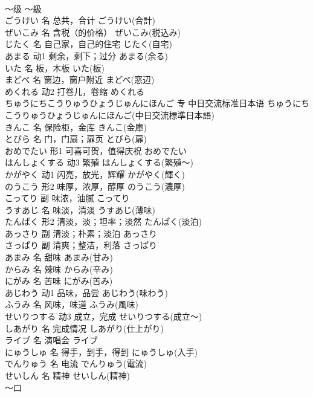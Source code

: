 \documentclass[8pt]{extreport}
\begin{document}
\begin{CJK}{UTF8}{min}
\\	～级	～級	
\\	ごうけい	名	总共，合计	ごうけい(合計)	
\\	ぜいこみ	名	含税（的价格）	ぜいこみ(税込み)	
\\	じたく	名	自己家，自己的住宅	じたく(自宅)	
\\	あまる	动1	剩余，剩下；过分	あまる(余る)	
\\	いた	名	板，木板	いた(板)	
\\	まどべ	名	窗边，窗户附近	まどべ(窓辺)	
\\	めくれる	动2	打卷儿，卷缩	めくれる	
\\	ちゅうにちこうりゅうひょうじゅんにほんご	专	中日交流标准日本语	ちゅうにちこうりゅうひょうじゅんにほんご(中日交流標準日本語)	
\\	きんこ	名	保险柜，金库	きんこ(金庫)	
\\	とびら	名	门，门扇；扉页	とびら(扉)	
\\	おめでたい	形1	可喜可贺，值得庆祝	おめでたい	
\\	はんしょくする	动3	繁殖	はんしょくする(繁殖～)	
\\	かがやく	动1	闪亮，放光，辉耀	かがやく(輝く)	
\\	のうこう	形2	味厚，浓厚，醇厚	のうこう(濃厚)	
\\	こってり	副	味浓，油腻	こってり	
\\	うすあじ	名	味淡，清淡	うすあじ(薄味)	
\\	たんぱく	形2	清淡，淡；坦率；淡然	たんぱく(淡泊)	
\\	あっさり	副	清淡；朴素；淡泊	あっさり	
\\	さっぱり	副	清爽；整洁，利落	さっぱり	
\\	あまみ	名	甜味	あまみ(甘み)	
\\	からみ	名	辣味	からみ(辛み)	
\\	にがみ	名	苦味	にがみ(苦み)	
\\	あじわう	动1	品味，品尝	あじわう(味わう)	
\\	ふうみ	名	风味，味道	ふうみ(風味)	
\\	せいりつする	动3	成立，完成	せいりつする(成立～)	
\\	しあがり	名	完成情况	しあがり(仕上がり)	
\\	ライブ	名	演唱会	ライブ	
\\	にゅうしゅ	名	得手，到手，得到	にゅうしゅ(入手)	
\\	でんりゅう	名	电流	でんりゅう(電流)	
\\	せいしん	名	精神	せいしん(精神)	
\\	～口	

\end{CJK}
\end{document}
